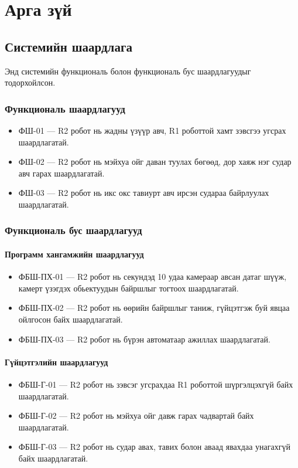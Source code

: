 \chapter{Арга зүй}

\section{Системийн шаардлага}
Энд системийн функциональ болон функциональ бус шаардлагуудыг тодорхойлсон.

\subsection{Функциональ шаардлагууд}

\begin{itemize}
	\item ФШ-01 --- R2 робот нь жадны үзүүр авч, R1 роботтой хамт зэвсгээ угсрах шаардлагатай.
	\item ФШ-02 --- R2 робот нь мэйхуа ойг даван туулах бөгөөд, дор хаяж нэг судар авч гарах шаардлагатай.
	\item ФШ-03 --- R2 робот нь икс окс тавиурт авч ирсэн судараа байрлуулах шаардлагатай.
\end{itemize}

\subsection{Функциональ бус шаардлагууд}

\subsubsection{Программ хангамжийн шаардлагууд}
\begin{itemize}
	\item ФБШ-ПХ-01 --- R2 робот нь секундэд 10 удаа камераар авсан датаг шүүж, камерт үзэгдэх обьектуудын байршлыг тогтоох шаардлагатай.
	\item ФБШ-ПХ-02 --- R2 робот нь өөрийн байршлыг таниж, гүйцэтгэж буй явцаа ойлгосон байх шаардлагатай.
	\item ФБШ-ПХ-03 --- R2 робот нь бүрэн автоматаар ажиллах шаардлагатай.
\end{itemize}

\subsubsection{Гүйцэтгэлийн шаардлагууд}
\begin{itemize}
	\item ФБШ-Г-01 --- R2 робот нь зэвсэг угсрахдаа R1 роботтой шүргэлцэхгүй байх шаардлагатай.
	\item ФБШ-Г-02 --- R2 робот нь мэйхуа ойг давж гарах чадвартай байх шаардлагатай.
	\item ФБШ-Г-03 --- R2 робот нь судар авах, тавих болон аваад явахдаа унагахгүй байх шаардлагатай.
\end{itemize}

